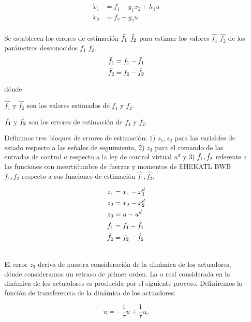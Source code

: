\begin{align}
    \dot x_{1} &= f_{1} + g_1 x_2 + h_1 u \\ \nonumber
    \dot x_{2} &= f_{2} + g_2 u \\ \nonumber
\end{align}

Se establecen los errores de estimación $\Tilde{f_1}$ $\Tilde{f_2}$ para estimar los valores $\hat{f_1}$ $\hat{f_2}$ de los parámetros desconocidos $f_1$ $f_2$. 
\begin{gather}
    \Tilde{f_1} =f_1 - \hat{f_1}\\ \nonumber
    \Tilde{f_2} = f_2 - \hat{f_2} \nonumber
\end{gather}

dónde

$\hat{f_1}$ y $\hat{f_2}$ son los valores estimados de $f_1$ y $f_2$.

$\Tilde{f_1}$ y $\Tilde{f_2}$ son los errores de estimación de $f_1$ y $f_2$.


Definimos tres bloques de errores de estimación: 1) $z_1, z_2$ para las variables de estado respecto a las señales de seguimiento, 2) $z_3$ para el comando de las entradas de control $u$ respecto a la ley de control virtual $u^d$ y 3) $\Tilde{f_1}, \Tilde{f_2}$ referente a las funciones con incertidumbre de fuerzas y momentos de EHEKATL BWB $f_1, f_2$ respecto a sus funciones de estimación $\hat{f_1}, \hat{f_2}$. 

\begin{align}
\label{errorres de estimacion adaptive}
    z_1 &= x_1 - x^d_1 \\ \nonumber
    z_2 &= x_2 - x^d_2 \\ \nonumber
    z_3 &= u - u^d \\ \nonumber
    \Tilde{f_1} &= f_1 - \hat{f_1} \\ \nonumber
    \Tilde{f_2} &= f_2 - \hat{f_2} \\ \nonumber
\end{align}

El error $z_3$ deriva de nuestra consideración de la dinámica de los actuadores, dónde consideramos un retraso de primer orden. La $u$ real considerada en la dinámica de los actuadores es producida por el siguiente proceso. Definiremos la función de transferencia de la dinámica de los actuadores: 

\begin{equation}
    \dot u = - \frac{1}{\tau}u + \frac{1}{\tau} u_c
\end{equation}

